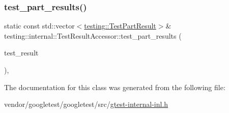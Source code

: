 \subsubsection{\texorpdfstring{test\+\_\+part\+\_\+results()}{test\_part\_results()}}
{\footnotesize\ttfamily static const std\+::vector$<$\hyperlink{classtesting_1_1_test_part_result}{testing\+::\+Test\+Part\+Result}$>$\& testing\+::internal\+::\+Test\+Result\+Accessor\+::test\+\_\+part\+\_\+results (\begin{DoxyParamCaption}\item[{const \hyperlink{classtesting_1_1_test_result}{Test\+Result} \&}]{test\+\_\+result }\end{DoxyParamCaption})\hspace{0.3cm}{\ttfamily [inline]}, {\ttfamily [static]}}



The documentation for this class was generated from the following file\+:\begin{DoxyCompactItemize}
\item 
vendor/googletest/googletest/src/\hyperlink{gtest-internal-inl_8h}{gtest-\/internal-\/inl.\+h}\end{DoxyCompactItemize}
